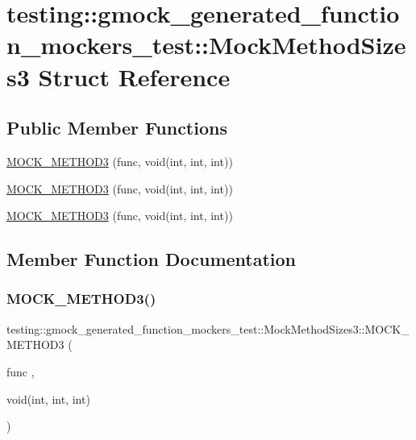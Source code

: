 \hypertarget{structtesting_1_1gmock__generated__function__mockers__test_1_1_mock_method_sizes3}{}\section{testing\+::gmock\+\_\+generated\+\_\+function\+\_\+mockers\+\_\+test\+::Mock\+Method\+Sizes3 Struct Reference}
\label{structtesting_1_1gmock__generated__function__mockers__test_1_1_mock_method_sizes3}
\subsection*{Public Member Functions}
\begin{DoxyCompactItemize}
\item 
\mbox{\hyperlink{structtesting_1_1gmock__generated__function__mockers__test_1_1_mock_method_sizes3_a53c9699f920b15d624620e8dab0bfc62}{M\+O\+C\+K\+\_\+\+M\+E\+T\+H\+O\+D3}} (func, void(int, int, int))
\item 
\mbox{\hyperlink{structtesting_1_1gmock__generated__function__mockers__test_1_1_mock_method_sizes3_a53c9699f920b15d624620e8dab0bfc62}{M\+O\+C\+K\+\_\+\+M\+E\+T\+H\+O\+D3}} (func, void(int, int, int))
\item 
\mbox{\hyperlink{structtesting_1_1gmock__generated__function__mockers__test_1_1_mock_method_sizes3_a53c9699f920b15d624620e8dab0bfc62}{M\+O\+C\+K\+\_\+\+M\+E\+T\+H\+O\+D3}} (func, void(int, int, int))
\end{DoxyCompactItemize}


\subsection{Member Function Documentation}
\mbox{\label{structtesting_1_1gmock__generated__function__mockers__test_1_1_mock_method_sizes3_a53c9699f920b15d624620e8dab0bfc62}} 
\subsubsection{\texorpdfstring{MOCK\_METHOD3()}{MOCK\_METHOD3()}\hspace{0.1cm}{\footnotesize\ttfamily [1/3]}}
{\footnotesize\ttfamily testing\+::gmock\+\_\+generated\+\_\+function\+\_\+mockers\+\_\+test\+::\+Mock\+Method\+Sizes3\+::\+M\+O\+C\+K\+\_\+\+M\+E\+T\+H\+O\+D3 (\begin{DoxyParamCaption}\item[{func}]{,  }\item[{void(int, int, int)}]{ }\end{DoxyParamCaption})}

